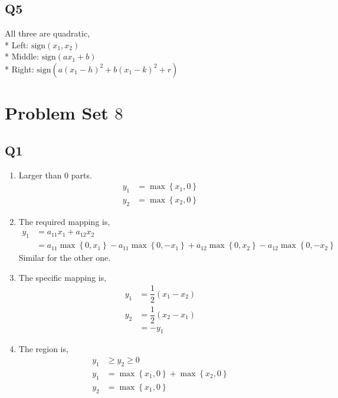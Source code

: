 \documentclass{article}
\begin{document}
\subsection{Q5}
All three are quadratic,
\\* Left: $\text{sign}\left(x_{1}, x_{2}\right)$
\\* Middle: $\text{sign}\left(a x_{1} + b\right)$
\\* Right: $\text{sign}\left(a \left(x_{1} - h\right)^{2} + b \left(x_{1} - k\right)^{2} + r\right)$






\section{Problem Set $8$} 

\subsection{Q1}
\begin{enumerate}
\item Larger than $0$ parts.
\begin{align*}
y_{1} &= \displaystyle\max\left\{x_{1}, 0\right\}
\\ y_{2} &= \displaystyle\max\left\{x_{2}, 0\right\}
\end{align*}
\item The required mapping is,
\begin{align*}
y_{1} &= a_{11} x_{1} + a_{12} x_{2}
\\ &= a_{11} \displaystyle\max\left\{0, x_{1}\right\} - a_{11} \displaystyle\max\left\{0, -x_{1}\right\} + a_{12} \displaystyle\max\left\{0, x_{2}\right\} - a_{12} \displaystyle\max\left\{0, -x_{2}\right\}
\end{align*}
Similar for the other one.

\item The specific mapping is,
\begin{align*}
y_{1} &= \dfrac{1}{2} \left(x_{1} - x_{2}\right)
\\ y_{2} &= \dfrac{1}{2} \left(x_{2} - x_{1}\right)
\\ &= -y_{1}
\end{align*}
\item The region is,
\begin{align*}
y_{1} &\geq  y_{2} \geq  0
\\ y_{1} &= \displaystyle\max\left\{x_{1}, 0\right\} + \displaystyle\max\left\{x_{2}, 0\right\}
\\ y_{2} &= \displaystyle\max\left\{x_{1}, 0\right\}
\end{align*}
\end{enumerate}
\end{document}
